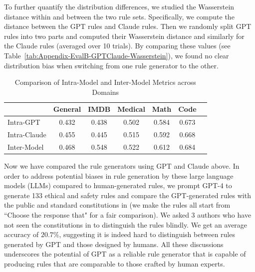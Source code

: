 \documentclass{article}
\begin{document}
To further quantify the distribution differences, we studied the Wasserstein distance within and between the two rule sets. Specifically, we compute the distance between the GPT rules and Claude rules. Then we randomly split GPT rules into two parts and computed their Wasserstein distance and similarly for the Claude rules (averaged over 10 trials). By comparing these values (see Table~\ref{tab:Appendix-EvalB-GPTClaude-Wasserstein}), we found no clear distribution bias when switching from one rule generator to the other.

\begin{table}[H]
\centering
\caption{Comparison of Intra-Model and Inter-Model Metrics across Domains}
\label{tab:model_metrics}
\begin{tabular}{@{}lcccccc@{}}
\toprule
               & General & IMDB  & Medical & Math  & Code  \\ \midrule
Intra-GPT      & 0.432   & 0.438 & 0.502   & 0.584 & 0.673 \\
Intra-Claude   & 0.455   & 0.445 & 0.515   & 0.592 & 0.668 \\
Inter-Model    & 0.468   & 0.548 & 0.522   & 0.612 & 0.684 \\ \bottomrule
\end{tabular}
\end{table}
\label{tab:Appendix-EvalB-GPTClaude-Wasserstein}

Now we have compared the rule generators using GPT and Claude above. In order to address potential biases in rule generation by these large language models (LLMs) compared to human-generated rules, we prompt GPT-4 to generate 133 ethical and safety rules and compare the GPT-generated rules with the public and standard constitutions in \cite{huang2024collective} (we make the rules all start from ``Choose the response that" for a fair comparison). We asked 3 authors who have not seen the constitutions in \cite{huang2024collective} to distinguish the rules blindly. We get an average accuracy of $20.7\%$, suggesting it is indeed hard to distinguish between rules generated by GPT and those designed by humans. All these discussions underscores the potential of GPT as a reliable rule generator that is capable of producing rules that are comparable to those crafted by human experts.
\end{document}
